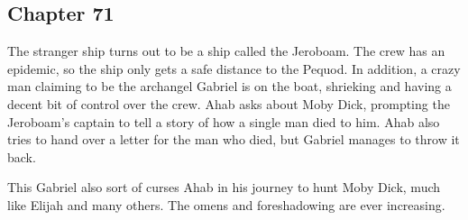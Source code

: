 \subsection{Chapter 71}

The stranger ship turns out to be a ship called the Jeroboam. The crew has an
epidemic, so the ship only gets a safe distance to the Pequod. In addition, a
crazy man claiming to be the archangel Gabriel is on the boat, shrieking and
having a decent bit of control over the crew. Ahab asks about Moby Dick,
prompting the Jeroboam's captain to tell a story of how a single man died to
him. Ahab also tries to hand over a letter for the man who died, but Gabriel
manages to throw it back.

This Gabriel also sort of curses Ahab in his journey to hunt Moby Dick, much
like Elijah and many others. The omens and foreshadowing are ever increasing.
